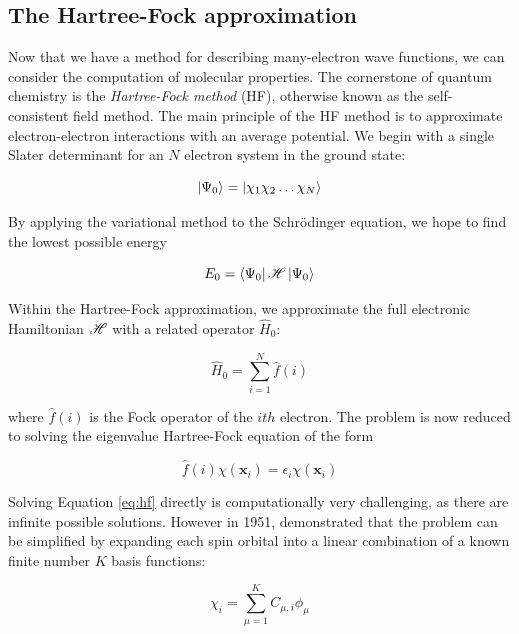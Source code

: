 \subsection{The Hartree-Fock approximation}

Now that we have a method for describing many-electron wave functions, we can
consider the computation of molecular properties. The cornerstone of quantum
chemistry is the \emph{Hartree-Fock method} (HF), otherwise known as the
self-consistent field method. The main principle of the HF method is to
approximate electron-electron interactions with an average potential. We begin
with a single Slater determinant for an $N$ electron system in the ground state:

\begin{equation}
\ket{\Psi_0} = \ket{\chi_1\chi_2\dots\chi_N}
\end{equation}

\noindent By applying the variational method to the Schr{\"o}dinger equation, we
hope to find the lowest possible energy

\begin{equation}
E_0 = \bra{\Psi_0}\mathscr{H}\ket{\Psi_0}
\end{equation}

Within the Hartree-Fock approximation, we approximate the full electronic
Hamiltonian $\mathscr{H}$ with a related operator $\hat{H}_0$:

\begin{equation}
\hat{H}_0 = \sum_{i=1}^N \hat{f}(i)
\end{equation}

\noindent where $\hat{f}(i)$ is the Fock operator of the $ith$ electron.  The
problem is now reduced to solving the eigenvalue Hartree-Fock equation of the
form

\begin{equation}
\hat{f}(i)\chi(\mathbf{x}_i) = \epsilon_i\chi(\mathbf{x}_i)
\label{eq:hf}
\end{equation}

Solving Equation \ref{eq:hf} directly is computationally very challenging, as
there are infinite possible solutions.  However in 1951, \citet{Roothaan1951}
demonstrated that the problem can be simplified by expanding each spin orbital
into a linear combination of a known finite number $K$ basis functions:

\begin{equation}
\chi_i = \sum_{\mu=1}^K C_{\mu,i}\phi_{\mu}
\end{equation}


